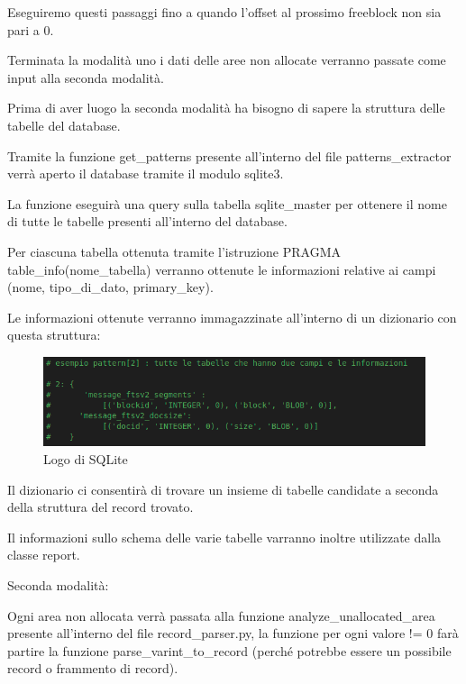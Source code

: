 \medskip

Eseguiremo questi passaggi fino a quando l’offset al prossimo freeblock non sia pari a 0.

\medskip

Terminata la modalità uno i dati delle aree non allocate verranno passate come input alla seconda modalità.

\medskip

Prima di aver luogo la seconda modalità ha bisogno di sapere la struttura delle tabelle del database.

\medskip

Tramite la funzione get\string_patterns presente all’interno del file patterns\string_extractor verrà aperto il database tramite il modulo sqlite3.

\medskip

La funzione eseguirà una query sulla tabella sqlite\string_master per ottenere il nome di tutte le tabelle presenti all’interno del database.

\medskip

Per ciascuna tabella ottenuta tramite l’istruzione PRAGMA table\string_info(nome\string_tabella) verranno ottenute le informazioni relative ai campi (nome, tipo\string_di\string_dato, primary\string_key).

\medskip

Le informazioni ottenute verranno immagazzinate all’interno di un dizionario con questa struttura:

\begin{figure}[ht]
	\centering
	\caption{Logo di SQLite}
	\label{fig:sqlitelogo}
	\includegraphics[scale=0.5]{assets/recovery_dict}
\end{figure}

Il dizionario ci consentirà di trovare un insieme di tabelle candidate a seconda della struttura del record trovato.

Il informazioni sullo schema delle varie tabelle varranno inoltre utilizzate dalla classe report.

\newpage

Seconda modalità:

Ogni area non allocata verrà passata alla funzione analyze\string_unallocated\string_area presente all’interno del file record\string_parser.py, la funzione per ogni valore != 0 farà partire la funzione parse\string_varint\string_to\string_record (perché potrebbe essere un possibile record o frammento di record).

